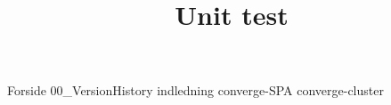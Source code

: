 \documentclass[a4paper,openany]{memoir}
\title{Unit test}
\begin{document}
	{Forside}  \newpage
	\tableofcontents\thispagestyle{fancy}
	{00_VersionHistory}  \newpage
	{indledning}  \newpage
	{converge-SPA}  \newpage
	{converge-cluster}  \newpage
	
	 {}
	\printbibliography
\end{document}
